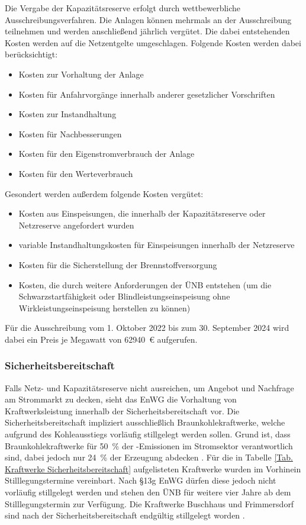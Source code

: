 			Die Vergabe der Kapazitätsreserve erfolgt durch wettbewerbliche Ausschreibungsverfahren.
			Die Anlagen können mehrmals an der Ausschreibung teilnehmen und werden anschließend jährlich vergütet.
			Die dabei entstehenden Kosten werden auf die Netzentgelte umgeschlagen. 
			Folgende Kosten werden dabei berücksichtigt: 
			\begin{itemize}
				\item Kosten zur Vorhaltung der Anlage
				\item Kosten für Anfahrvorgänge innerhalb anderer gesetzlicher Vorschriften
				\item Kosten zur Instandhaltung
				\item Kosten für Nachbesserungen
				\item Kosten für den Eigenstromverbrauch der Anlage
				\item Kosten für den Werteverbrauch
			\end{itemize}
			Gesondert werden außerdem folgende Kosten vergütet:
			\begin{itemize}
				\item Kosten aus Einspeisungen, die innerhalb der Kapazitätsreserve oder Netzreserve angefordert wurden
				\item variable Instandhaltungskosten für Einspeisungen innerhalb der Netzreserve
				\item Kosten für die Sicherstellung der Brennstoffversorgung 
				\item Kosten, die durch weitere Anforderungen der ÜNB entstehen (um die Schwarzstartfähigkeit oder Blindleistungseinspeisung ohne Wirkleistungseinspeisung herstellen zu können)
			\end{itemize}
			Für die Ausschreibung vom 1. Oktober 2022 bis zum 30. September 2024 wird dabei ein Preis je Megawatt von \SI{62940}{\euro} aufgerufen.
		
		\subsubsection{Sicherheitsbereitschaft}
		
			Falls Netz- und Kapazitätsreserve nicht ausreichen, um Angebot und Nachfrage am Strommarkt zu decken, sieht das EnWG die Vorhaltung von Kraftwerksleistung innerhalb der Sicherheitsbereitschaft vor.
			Die Sicherheitsbereitschaft impliziert ausschließlich Braunkohlekraftwerke, welche aufgrund des Kohleausstiegs vorläufig stillgelegt werden sollen.
			Grund ist, dass Braunkohlekraftwerke für \SI{50}{\percent} der \COO-Emissionen im Stromsektor verantwortlich sind, dabei jedoch nur \SI{24}{\percent} der Erzeugung abdecken \cite[S. 11 u. S. 31 f.]{Agora_Braunkohle}.		
			Für die in Tabelle \ref{Tab. Kraftwerke Sicherheitsbereitschaft} aufgelisteten Kraftwerke wurden im Vorhinein Stilllegungstermine vereinbart.
			Nach §13g EnWG dürfen diese jedoch nicht vorläufig stillgelegt werden und stehen den ÜNB für weitere vier Jahre ab dem Stilllegungstermin zur Verfügung.
			Die Kraftwerke Buschhaus und Frimmersdorf sind nach der Sicherheitsbereitschaft endgültig stillgelegt worden \cite{EnWG}.  
		
